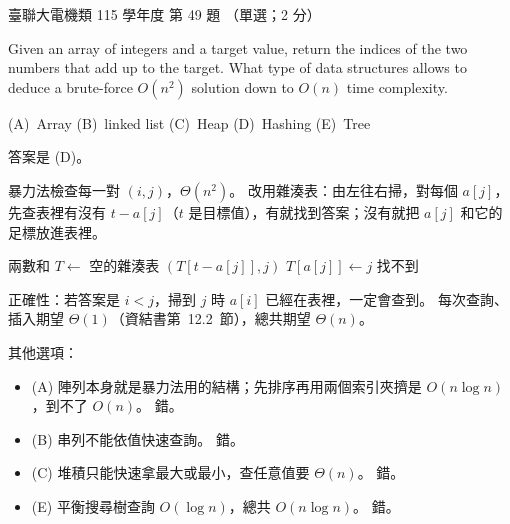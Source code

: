 \begin{pastexam}[label={px:ust-115-ee-ds-49}]{臺聯大電機類 115 學年度 第 49 題}
（單選；2 分）

Given an array of integers and a target value, return the indices of the two numbers that add up to
the target. What type of data structures allows to deduce a brute-force $O(n^2)$ solution down to
$O(n)$ time complexity.

(A)~Array \qquad (B)~linked list \qquad (C)~Heap \qquad (D)~Hashing \qquad (E)~Tree
\end{pastexam}

\begin{pastsoln}
答案是 (D)。

暴力法檢查每一對 $(i, j)$，$\Theta(n^2)$。 改用雜湊表：由左往右掃，對每個 $a[j]$，先查表裡有沒有
$t - a[j]$（$t$ 是目標值），有就找到答案；沒有就把 $a[j]$ 和它的足標放進表裡。
\begin{pseudo}{兩數和}
\State $T \gets$ 空的雜湊表 
        \State \Return $(T[t - a[j]], j)$
    \EndIf
    \State $T[a[j]] \gets j$
\EndFor
\State \Return 找不到
\end{pseudo}
正確性：若答案是 $i < j$，掃到 $j$ 時 $a[i]$ 已經在表裡，一定會查到。 每次查詢、插入期望
$\Theta(1)$（資結書第~12.2~節），總共期望 $\Theta(n)$。

其他選項：
\begin{itemize}
\item (A) 陣列本身就是暴力法用的結構；先排序再用兩個索引夾擠是 $O(n \log n)$，到不了 $O(n)$。 錯。
\item (B) 串列不能依值快速查詢。 錯。
\item (C) 堆積只能快速拿最大或最小，查任意值要 $\Theta(n)$。 錯。
\item (E) 平衡搜尋樹查詢 $O(\log n)$，總共 $O(n \log n)$。 錯。
\end{itemize}
\end{pastsoln}
